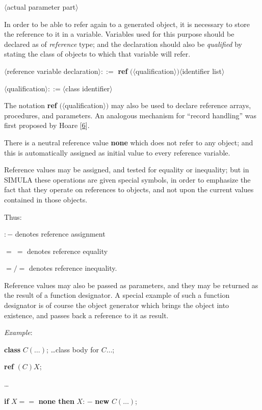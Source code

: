 \documentclass[twoside,11pt]{book}
\begin{document}
\tabto*{11.6em}$\langle$actual parameter part$\rangle$

In order to be able to refer again to a generated object, it is necessary to store the reference to it in a variable. Variables used for this purpose should be declared as of \textit{reference} type; and the declaration should also be \textit{qualified} by stating the class of objects to which that variable will refer.

\quad $\langle$reference variable declaration$\rangle ::=$ \textbf{ref} $(\langle $qualification$\rangle) \langle$identifier list$\rangle$

\quad $\langle$qualification$\rangle ::= \langle$class identifier$\rangle$

\noindent
The notation \textbf{ref} $(\langle$qualification$\rangle)$ may also be used to declare reference arrays, procedures, and parameters. An analogous mechanism for ``record handling'' was first proposed by Hoare [\hyperref[ref:6]{6}].

There is a neutral reference value \textbf{none} which does not refer to any object; and this is automatically assigned as initial value to every reference variable.

Reference values may be assigned, and tested for equality or inequality; but in SIMULA these operations are given special symbols, in order to emphasize the fact that they operate on references to objects, and not upon the current values contained in those objects.

\noindent
Thus:

\quad $:-$\tabto*{5.6em} denotes reference assignment

\quad $=\ =$\tabto*{5.6em} denotes reference equality

\quad $=/=$\tabto*{5.6em} denotes reference inequality.

\noindent
Reference values may also be passed as parameters, and they may be returned as the result of a function designator. A special example of such a function designator is of course the object generator which brings the object into existence, and passes back a reference to it as result.

\noindent
\textit{Example}:

\quad \textbf{class} $C(\dots)$; \dots class body for $C\dots$;

\quad \textbf{ref} $(C)X$;

\qquad \dots

\qquad \textbf{if} $X ==$ \textbf{none then} $X$: $-$ \textbf{new} $C(\dots)$;
\end{document}
